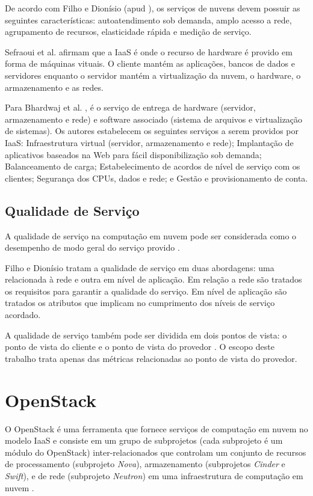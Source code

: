 \documentclass[conference]{IEEEtran}
\begin{document}
De acordo com Filho e Dionísio \cite{leite2016influencia} (apud \cite{mell2011nist}), os serviços de nuvens devem possuir as seguintes
características: autoatendimento sob demanda, amplo acesso a rede,
agrupamento de recursos, elasticidade rápida e medição de serviço.

Sefraoui et al. \cite{sefraoui2012openstack} afirmam que a IaaS é onde o recurso de hardware é provido em forma de máquinas vituais. 
O cliente mantém as aplicações, bancos de dados e servidores enquanto o servidor mantém a virtualização da nuvem, 
o hardware, o armazenamento e as redes. 

Para Bhardwaj et al. \cite{bhardwaj2010cloud}, é o serviço de entrega de hardware 
(servidor, armazenamento e rede) e software associado (sistema de arquivos e virtualização de sistemas). Os autores estabelecem
os seguintes serviços a serem providos  por IaaS: Infraestrutura virtual (servidor, armazenamento e rede);
Implantação de aplicativos baseados na Web para fácil disponibilização sob demanda; Balanceamento de carga; 
Estabelecimento de acordos de nível de serviço com os clientes;  Segurança dos CPUs, dados e rede;
e Gestão e provisionamento de conta.

\subsection{Qualidade de Serviço}

A qualidade de serviço na computação em nuvem pode ser considerada como o
desempenho de modo geral do serviço provido \cite{openstack}.

Filho e Dionísio \cite{leite2016influencia} tratam a qualidade de serviço em duas abordagens:
uma relacionada à rede e outra em nível de aplicação. Em relação a rede são tratados
os requisitos para garantir a qualidade do serviço. Em nível de aplicação são tratados
os atributos que implicam no cumprimento dos níveis de serviço acordado. 

A qualidade de serviço também pode ser dividida em dois pontos de vista: o 
ponto de vista do cliente e o ponto de vista do provedor \cite{openstack, bhardwaj2010cloud}. 
O escopo deste trabalho trata apenas das métricas relacionadas ao ponto de vista do provedor.


\section{OpenStack}

O OpenStack é uma ferramenta que fornece serviços de computação em nuvem no modelo IaaS e consiste em um grupo de subprojetos (cada subprojeto é um módulo 
do OpenStack) inter-relacionados 
que controlam um conjunto de recursos de processamento (subprojeto \textit{Nova}), armazenamento (subprojetos \textit{Cinder} e \textit{Swift}),
e de rede (subprojeto \textit{Neutron}) em uma infraestrutura de computação em nuvem \cite{openstack} \cite{bui2016}.
\end{document}
